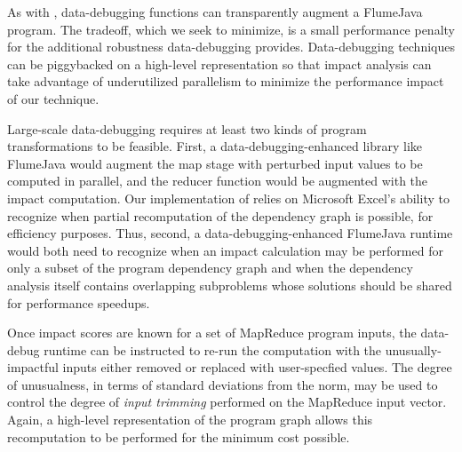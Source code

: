 As with \checkcell, data-debugging functions can transparently augment a FlumeJava program.  The tradeoff, which we seek to minimize, is a small performance penalty for the additional robustness data-debugging provides. Data-debugging techniques can be piggybacked on a high-level representation so that impact analysis can take advantage of underutilized parallelism to minimize the performance impact of our technique.

Large-scale data-debugging requires at least two kinds of program transformations to be feasible.  First, a data-debugging-enhanced library like FlumeJava would augment the map stage with perturbed input values to be computed in parallel, and the reducer function would be augmented with the impact computation.  Our implementation of \checkcell relies on Microsoft Excel's ability to recognize when partial recomputation of the dependency graph is possible, for efficiency purposes.  Thus, second, a data-debugging-enhanced FlumeJava runtime would both need to recognize when an impact calculation may be performed for only a subset of the program dependency graph and when the dependency analysis itself contains overlapping subproblems whose solutions should be shared for performance speedups.

Once impact scores are known for a set of MapReduce program inputs, the data-debug runtime can be instructed to re-run the computation with the unusually-impactful inputs either removed or replaced with user-specfied values.  The degree of unusualness, in terms of standard deviations from the norm, may be used to control the degree of \emph{input trimming} performed on the MapReduce input vector.  Again, a high-level representation of the program graph allows this recomputation to be performed for the minimum cost possible.